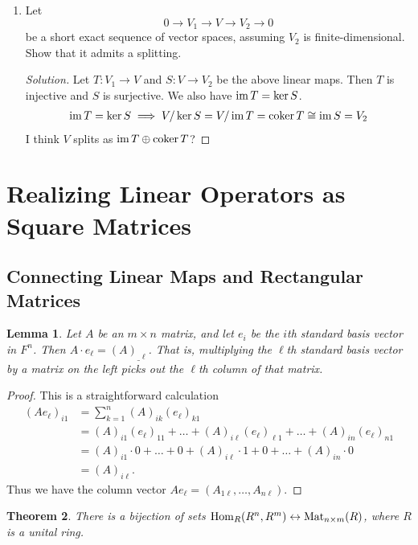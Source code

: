 \documentclass[12pt]{article}
\theoremstyle{definition}
\theoremstyle{plain}
\newtheorem{theorem}{Theorem}[section]
\newtheorem{lemma}[theorem]{Lemma}
\newenvironment{solution}
  {\begin{proof}[Solution]}
  {\end{proof}}
\numberwithin{equation}{section}
\theoremstyle{definition}
\begin{document}
\begin{enumerate}
\item Let 
\[ 0 \to V_1 \to V \to V_2 \to 0 \]
be a short exact sequence of vector spaces, assuming $ V_2 $ is finite-dimensional. Show that it admits a splitting.
\begin{solution}
Let $ T : V_1 \to V $ and $ S : V \to V_2 $ be the above linear maps. Then $ T $ is injective and $ S $ is surjective. We also have $ \operatorname{im} T = \ker S $.
\begin{align*}
	\operatorname{im} T = \ker S \implies V / \ker S = V / \operatorname{im} T = \operatorname{coker} T \cong \operatorname{im} S = V_2
\end{align*}
I think $ V $ splits as $ \operatorname{im} T \oplus \operatorname{coker} T $?
\end{solution}
\end{enumerate}

\section{Realizing Linear Operators as Square Matrices}

\subsection{Connecting Linear Maps and Rectangular Matrices}

\begin{lemma}
Let $ A $ be an $ m \times n$ matrix, and let $ e_i $ be the $ i $th standard basis vector in $ F^n $. Then $ A \cdot e_\ell = (A)_{\_ \ell}$. That is, multiplying the $ \ell $th standard basis vector by a matrix on the left picks out the $ \ell $th column of that matrix.
\end{lemma}

\begin{proof}
This is a straightforward calculation
\begin{align*}
	(A e_\ell)_{i1} &= \sum_{k = 1}^n (A)_{ik} (e_\ell)_{k1}\\
	&= (A)_{i1} (e_\ell)_{11} + \ldots + (A)_{i \ell} (e_\ell)_{\ell 1} + \ldots + (A)_{i n} (e_\ell)_{n 1}\\
	&= (A)_{i 1} \cdot 0 + \ldots + 0 + (A)_{i \ell} \cdot 1 + 0 + \ldots + (A)_{i n} \cdot 0\\
	&= (A)_{i \ell}.
\end{align*}
Thus we have the column vector $ A e_\ell = (A_{1 \ell}, \ldots, A_{n \ell})$.
\end{proof}

\begin{theorem}
There is a bijection of sets
$ \operatorname{Hom}_R (R^n, R^m) \leftrightarrow \operatorname{Mat}_{n \times m}(R) $,
where $ R $ is a unital ring.
\end{theorem}
\end{document}
